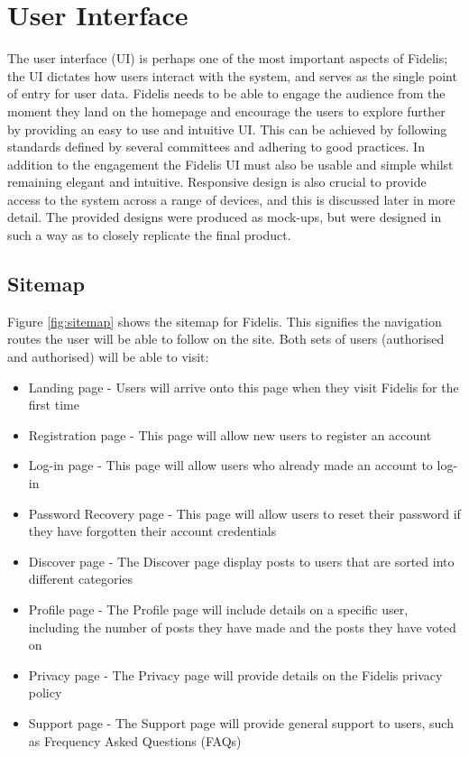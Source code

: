 \section{User Interface}
The user interface (UI) is perhaps one of the most important aspects of Fidelis; the UI dictates how users interact with the system, and serves as the single point of entry for user data. Fidelis needs to be able to engage the audience from the moment they land on the homepage and encourage the users to explore further by providing an easy to use and intuitive UI. This can be achieved by following standards defined by several committees and adhering to good practices. In addition to the engagement the Fidelis UI must also be usable and simple whilst remaining elegant and intuitive. Responsive design is also crucial to provide access to the system across a range of devices, and this is discussed later in more detail. The provided designs were produced as mock-ups, but were designed in such a way as to closely replicate the final product.

\subsection{Sitemap}
Figure \ref{fig:sitemap} shows the sitemap for Fidelis. This signifies the navigation routes the user will be able to follow on the site. Both sets of users (authorised and authorised) will be able to visit:
\begin{itemize}
\item Landing page - Users will arrive onto this page when they visit Fidelis for the first time
\item Registration page - This page will allow new users to register an account
\item Log-in page - This page will allow users who already made an account to log-in 
\item Password Recovery page - This page will allow users to reset their password if they have forgotten their account credentials
\item Discover page - The Discover page display posts to users that are sorted into different categories
\item Profile page - The Profile page will include details on a specific user, including the number of posts they have made and the posts they have voted on
\item Privacy page - The Privacy page will provide details on the Fidelis privacy policy
\item Support page - The Support page will provide general support to users, such as Frequency Asked Questions (FAQs)
\end{itemize}

